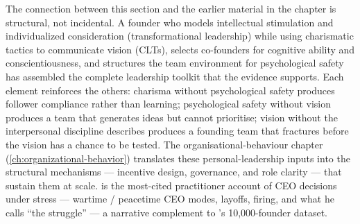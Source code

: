 The connection between this section and the earlier material in the chapter is structural, not
incidental. A founder who models intellectual stimulation and individualized consideration
(transformational leadership) while using charismatic tactics to communicate vision (CLTs),
selects co-founders for cognitive ability and conscientiousness, and structures the team
environment for psychological safety has assembled the complete leadership toolkit that the
evidence supports. Each element reinforces the others: charisma without psychological safety
produces follower compliance rather than learning; psychological safety without vision produces a
team that generates ideas but cannot prioritise; vision without the interpersonal discipline
\textcite{wasserman2012founders} describes produces a founding team that fractures before the
vision has a chance to be tested. The organisational-behaviour chapter
(\cref{ch:organizational-behavior}) translates these personal-leadership inputs into the
structural mechanisms --- incentive design, governance, and role clarity --- that sustain them
at scale. \textcite{horowitz2014hard} is the most-cited practitioner account of CEO decisions under stress --- wartime / peacetime CEO modes, layoffs, firing, and what he calls ``the struggle'' --- a narrative complement to \textcite{wasserman2012founders}'s 10{,}000-founder dataset.

